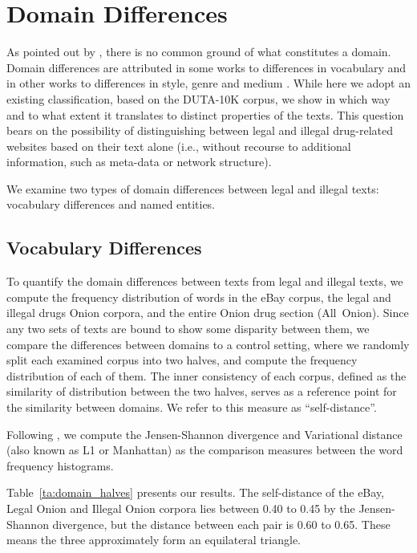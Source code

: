 \documentclass[11pt,a4paper,table]{article}
\begin{document}
\section{Domain Differences}\label{sec:domain}

As pointed out by \citet{Plank11}, there is no common ground of what constitutes a domain. Domain differences are attributed in some works to differences in vocabulary \citep{Blitzer06} and in other works to differences in style, genre and medium \citep{McClosky2010}. While here we adopt an existing classification, based on the DUTA-10K corpus, 
we show in which way and to what extent it translates to distinct properties of the texts. 
This question bears on the possibility of distinguishing between legal and illegal drug-related websites based on their text alone (i.e., without recourse to additional information, such as meta-data or network structure).
    
We examine two types of domain differences between legal and illegal texts: vocabulary differences and named entities. 

\subsection{Vocabulary Differences}

    To quantify the domain differences between texts from legal and illegal texts,
    we compute the frequency distribution of words in the eBay corpus, the legal and illegal drugs Onion corpora, and the entire Onion drug section (All~Onion). 
    Since any two sets of texts are bound to show some disparity between them, we compare the differences between domains to a control setting, where we randomly split each examined corpus into two halves, and compute the frequency distribution of each of them.
    The inner consistency of each corpus, defined as the similarity of distribution between the two halves, serves as a reference point for the similarity between domains.
    We refer to this measure as ``self-distance''.
    
    Following \citet{Plank2011EffectiveMO}, we compute the Jensen-Shannon divergence and Variational distance (also known as L1 or Manhattan) as the comparison measures between the word frequency histograms.
    
    Table~\ref{ta:domain_halves} presents our results.
    The self-distance of the eBay, Legal Onion and Illegal Onion corpora lies between 0.40 to 0.45
    by the Jensen-Shannon divergence, but the distance between each pair is 0.60 to 0.65. 
    These means the three approximately form an equilateral triangle.     
\end{document}
